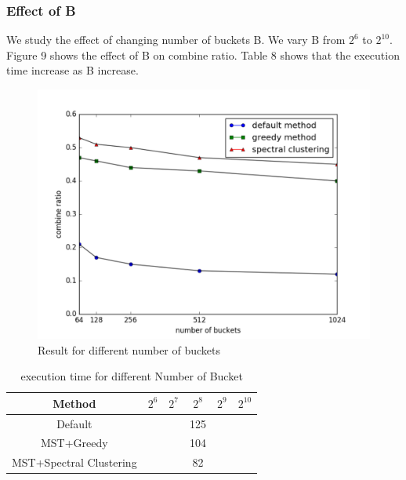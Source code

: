 \documentclass{vldb}
\begin{document}
\subsubsection{Effect of B}
We study the effect of changing number of buckets B. We vary B from $2^{6}$ to $2^{10}$. Figure 9 shows the effect of B on combine ratio. Table 8 shows that the execution time increase as B increase.
\begin{figure}
\centering
\includegraphics[scale=0.45]{FBucketNumber}
\caption{Result for different number of buckets}
\label{fig:BucketNumber}
\end{figure}

\begin{table} [h]
\centering
\caption{execution time for different Number of Bucket}
\label{tab:table}
\begin{tabular}{|c|c|c|c|c|c|} \hline
Method & $2^{6}$ & $2^{7}$ & $2^{8}$ & $2^{9}$ & $2^{10}$ \\\hline
Default & & & 125 & &\\\hline
MST+Greedy & & & 104 & & \\\hline
MST+Spectral Clustering & & & 82 & & \\\hline
\end{tabular}\\
\end{table}
\end{document}
